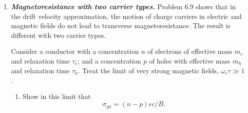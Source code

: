 \documentclass{homework}
\newcommand{\solution}{	\vspace{1em} \textit{Solution.} \quad }
\begin{document}
\begin{enumerate}
\begin{enumerate}
				\solution The conduction concentration can be found using the notes of 9.3. The coefficient is \begin{align*}
					N_c & = 2 \left(\frac{m_e k_B T}{2 \pi \hbar^2}\right)^{3/2} \\
						& = 2 \left( \frac{0.01 m k_B \times \SI{4}{\K}}{2 \pi \hbar^2} \right)^{3/2} = \SI{3.86e13}{\per\cm\cubed}.
					\intertext{With the approximation $\epsilon_F \approx \frac{1}{2} E_g$, the electron concentration is}
					n & \approxeq (N_c N_d)^{1/2} e^{-E_d / 2 k_B T} \\
						& = \left[
						\left(\SI{3.86e13}{\per\cm\cubed}\right) \left(10^{13}\si{\per\cm\cubed}\right)\right]^{1/2} \times \exp( - \SI{1}{\meV} / 2 k_B \cdot \SI{4}{\K}) \\
						& = \SI{4.61e12}{\per\cm\cubed}.
				\end{align*}
				
				\item What is the value of the Hall coefficient? Assume no acceptor atoms are present and that $E_g \gg k_B T$.
				
				\solution From (7.55), \begin{align*}
					R_H & = - \frac{1}{ne} = -\frac{1}{\SI{4.61e12}{\per \cm \cubed} \times e} \\
						& = -\SI{1.355}{\m\cubed\per\coulomb}.
				\end{align*}
				
			\end{enumerate}
		
		\pagebreak
		
		\item %
			\textbf{\textit{Magnetoresistance with two carrier types.}} Problem 6.9 shows that in the drift velocity approximation, the motion of charge carriers in electric and magnetic fields do not lead to transverse magnetoresistance. The result is different with two carrier types. 
			
			Consider a conductor with a concentration $n$ of electrons of effective mass $m_e$ and relaxation time $\tau_e$; and a concentration $p$ of holes with effective mass $m_h$ and relaxation time $\tau_h$. Treat the limit of very strong magnetic fields, $\omega_c \tau \gg 1$. \begin{enumerate}
				\item Show in this limit that $$\sigma_{yx} = (n-p)ec/B.$$
				

\end{enumerate}
\end{enumerate}
\end{document}
